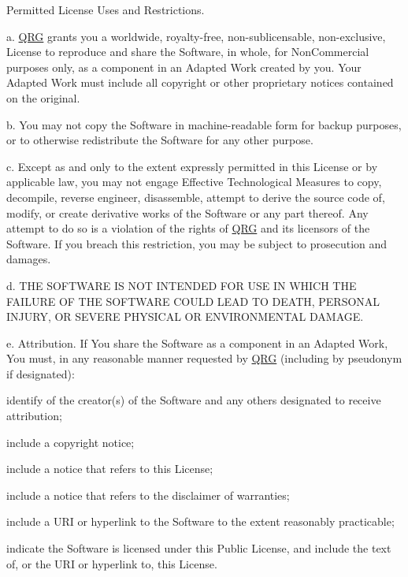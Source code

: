 \begin{DoxyEnumerate}
\item Permitted License Uses and Restrictions.
\end{DoxyEnumerate}

a. \mbox{\hyperlink{namespace_q_r_g}{QRG}} grants you a worldwide, royalty-\/free, non-\/sublicensable, non-\/exclusive, License to reproduce and share the Software, in whole, for Non\+Commercial purposes only, as a component in an Adapted Work created by you. Your Adapted Work must include all copyright or other proprietary notices contained on the original.

b. You may not copy the Software in machine-\/readable form for backup purposes, or to otherwise redistribute the Software for any other purpose.

c. Except as and only to the extent expressly permitted in this License or by applicable law, you may not engage Effective Technological Measures to copy, decompile, reverse engineer, disassemble, attempt to derive the source code of, modify, or create derivative works of the Software or any part thereof. Any attempt to do so is a violation of the rights of \mbox{\hyperlink{namespace_q_r_g}{QRG}} and its licensors of the Software. If you breach this restriction, you may be subject to prosecution and damages.

d. THE SOFTWARE IS NOT INTENDED FOR USE IN WHICH THE FAILURE OF THE SOFTWARE COULD LEAD TO DEATH, PERSONAL INJURY, OR SEVERE PHYSICAL OR ENVIRONMENTAL DAMAGE.

e. Attribution. If You share the Software as a component in an Adapted Work, You must, in any reasonable manner requested by \mbox{\hyperlink{namespace_q_r_g}{QRG}} (including by pseudonym if designated)\+:
\begin{DoxyItemize}
\item identify of the creator(s) of the Software and any others designated to receive attribution;
\item include a copyright notice;
\item include a notice that refers to this License;
\item include a notice that refers to the disclaimer of warranties;
\item include a URI or hyperlink to the Software to the extent reasonably practicable;
\item indicate the Software is licensed under this Public License, and include the text of, or the URI or hyperlink to, this License.
\end{DoxyItemize}

